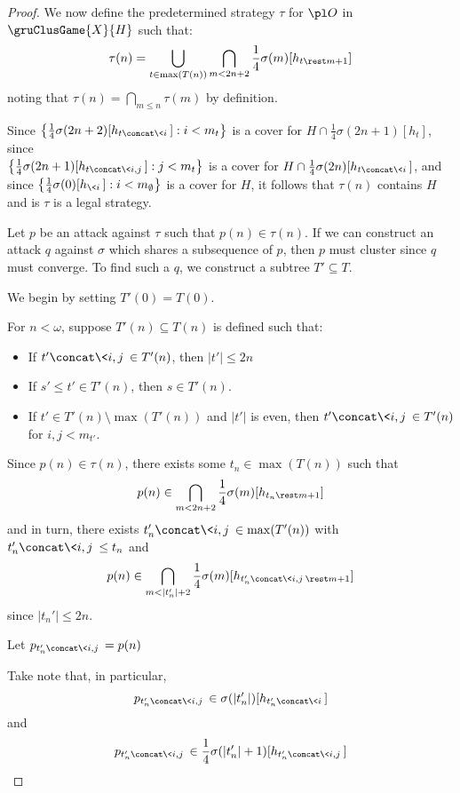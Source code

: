 \begin{proof}
  \bigskip

  We now define the predetermined strategy $\tau$ for $\pl O$ in
  $\gruClusGame{X}{H}$ such that:
  \[
    \tau(n)
      =
    \bigcup_{t\in\max(T(n))}
      \bigcap_{m<2n+2}
        \frac{1}{4}\sigma(m)[h_{t\rest m+1}]
  \]
  noting that $\tau(n)=\bigcap_{m\leq n}\tau(m)$ by definition.

  Since
  $\left\{\frac{1}{4}\sigma(2n+2)[h_{t\concat\<i\>}]:i<m_{t}\right\}$ is a cover
  for $H\cap \frac{1}{4}\sigma(2n+1)[h_{t}]$, since \\
  $\left\{\frac{1}{4}\sigma(2n+1)[h_{t\concat\<i,j\>}]:j<m_{t}\right\}$ is
  a cover for $H\cap \frac{1}{4}\sigma(2n)[h_{t\concat\<i\>}]$, and since
  $\left\{\frac{1}{4}\sigma(0)[h_{\<i\>}]:i<m_{\emptyset}\right\}$ is a
  cover for $H$, it follows that $\tau(n)$ contains $H$ and is $\tau$ is
  a legal strategy.


  Let $p$ be an attack against $\tau$ such that
  $p(n)\in \tau(n)$. If we can construct an attack $q$
  against $\sigma$ which shares a subsequence of $p$, then $p$ must cluster
  since $q$ must converge.
  To find such a $q$, we construct a subtree $T'\subseteq T$.

  We begin by setting $T'(0)=T(0)$.

  For $n<\omega$, suppose $T'(n)\subseteq T(n)$ is defined such that:
    \begin{itemize}
      \item If $t'\concat\<i,j\>\in T'(n)$, then $|t'|\leq 2n$
      \item If $s'\leq t'\in T'(n)$, then $s\in T'(n)$.
      \item If $t'\in T'(n)\setminus\max(T'(n))$ and $|t'|$ is even,
            then $t'\concat\<i,j\>\in T'(n)$ for $i,j<m_{t'}$.
    \end{itemize}

  Since $p(n)\in\tau(n)$, there exists some $t_n\in\max(T(n))$ such that
  \[
    p(n)
      \in
    \bigcap_{m<2n+2}
    \frac{1}{4}\sigma(m)[h_{t_n\rest m+1}]
  \]
  and in turn, there exists $t_n'\concat\<i,j\>\in\max(T'(n))$
  with $t_n'\concat\<i,j\>\leq t_n$ and
  \[
    p(n)
      \in
    \bigcap_{m<|t_n'|+2}
    \frac{1}{4}\sigma(m)[h_{t_n'\concat\<i,j\>\rest m+1}]
  \]
  since $|t_n'|\leq 2n$.

  Let $p_{t_n'\concat\<i,j\>}=p(n)$

  Take note that, in particular,
  \[
    p_{t_n'\concat\<i,j\>}
      \in
    \sigma(|t_n'|)[h_{t_n'\concat\<i\>}]
  \]
  and
  \[
    p_{t_n'\concat\<i,j\>}
      \in
    \frac{1}{4}\sigma(|t_n'|+1)[h_{t_n'\concat\<i,j\>}]
  \]


\end{proof}
